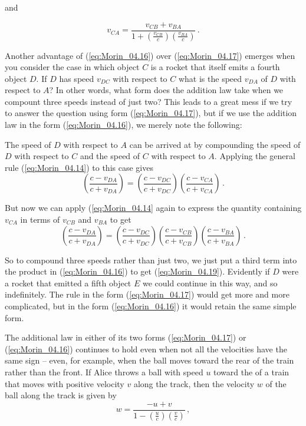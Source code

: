 and 

\begin{equation}\label{eq:Morin_04.17}
v_{CA} = \frac{v_{CB} + v_{BA}}{1 + \left(\frac{v_{CB}}{c}\right) \left(\frac{v_{BA}}{c}\right)}\,.
\end{equation}

Another advantage of (\ref{eq:Morin_04.16}) over (\ref{eq:Morin_04.17}) emerges when you consider the case in which object $C$ is a rocket that itself emits a fourth object $D$. If $D$ has speed $v_{DC}$ with respect to $C$ what is the speed $v_{DA}$ of $D$ with respect to $A$? In other words, what form does the addition law take when we compount three speeds instead of just two? This leads to a great mess if we try to answer the question using form (\ref{eq:Morin_04.17}), but if we use the addition law in the form (\ref{eq:Morin_04.16}), we merely note the following:

The speed of $D$ with respect to $A$ can be arrived at by compounding the speed of $D$ with respect to $C$ and the speed of $C$ with respect to $A$. Applying the general rule (\ref{eq:Morin_04.14}) to this case gives 
\begin{equation}\label{eq:Morin_04.18}
\left( \frac{c - v_{DA}}{c + v_{DA}} \right) = \left( \frac{c - v_{DC}}{c + v_{DC}} \right)  \left( \frac{c - v_{CA}}{c + v_{CA}} \right)\,.
\end{equation}

But now we can apply (\ref{eq:Morin_04.14} again to express the quantity containing $v_{CA}$ in terms of $v_{CB}$ and $v_{BA}$ to get
\begin{equation}\label{eq:Morin_04.19}
\left( \frac{c - v_{DA}}{c + v_{DA}} \right) = \left( \frac{c - v_{DC}}{c + v_{DC}} \right)  \left( \frac{c - v_{CB}}{c + v_{CB}} \right) \left( \frac{c - v_{BA}}{c + v_{BA}} \right) \,.
\end{equation}

So to compound three speeds rather than just two, we just put a third term into the product in (\ref{eq:Morin_04.16}) to get (\ref{eq:Morin_04.19}). Evidently if $D$ were a rocket that emitted a fifth object $E$ we could continue in this way, and so indefinitely. The rule in the form (\ref{eq:Morin_04.17}) would get more and more complicated, but in the form (\ref{eq:Morin_04.16}) it would retain the same simple form.

The additional law in either of its two forms (\ref{eq:Morin_04.17}) or (\ref{eq:Morin_04.16}) continues to hold even when not all the velocities have the same sign -- even, for example, when the ball moves toward the rear of the train rather than the front. If Alice throws a ball with speed $u$ toward the  of a train that moves with positive velocity $v$ along the track, then the velocity $w$ of the ball along the track is given by
\begin{equation}\label{eq:Morin_04.20}
w = \frac{-u + v}{1 - \left( \frac{u}{c}\right) \left( \frac{v}{c}\right)}\,,
\end{equation}

